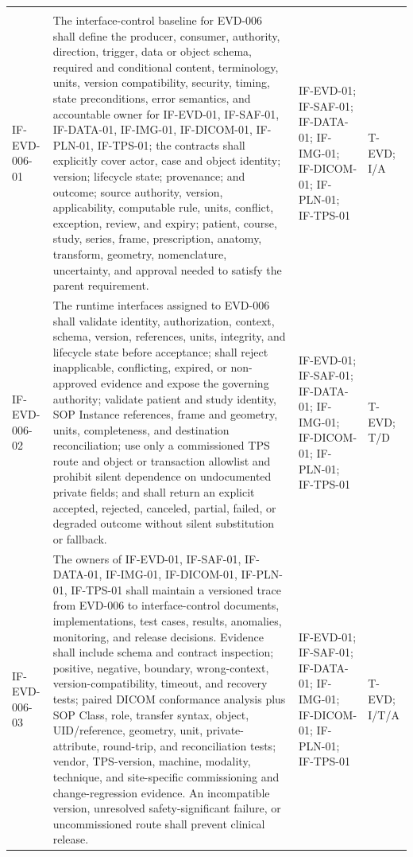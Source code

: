 \documentclass[11pt,letterpaper]{article}
\begin{document}
\begin{scriptsize}
\begin{longtable}{@{}L{0.14\textwidth}L{0.49\textwidth}L{0.19\textwidth}L{0.10\textwidth}@{}}
\addlinespace[2pt]
 \\
\addlinespace[2pt]
\mbox{IF-EVD-006-01} & The interface-control baseline for EVD-006 shall define the producer, consumer, authority, direction, trigger, data or object schema, required and conditional content, terminology, units, version compatibility, security, timing, state preconditions, error semantics, and accountable owner for IF-EVD-01, IF-SAF-01, IF-DATA-01, IF-IMG-01, IF-DICOM-01, IF-PLN-01, IF-TPS-01; the contracts shall explicitly cover actor, case and object identity; version; lifecycle state; provenance; and outcome; source authority, version, applicability, computable rule, units, conflict, exception, review, and expiry; patient, course, study, series, frame, prescription, anatomy, transform, geometry, nomenclature, uncertainty, and approval needed to satisfy the parent requirement. & IF-EVD-01; IF-SAF-01; IF-DATA-01; IF-IMG-01; IF-DICOM-01; IF-PLN-01; IF-TPS-01 & T-EVD; I\slash\allowbreak{}A \\
\addlinespace[2pt]
\mbox{IF-EVD-006-02} & The runtime interfaces assigned to EVD-006 shall validate identity, authorization, context, schema, version, references, units, integrity, and lifecycle state before acceptance; shall reject inapplicable, conflicting, expired, or non-approved evidence and expose the governing authority; validate patient and study identity, SOP Instance references, frame and geometry, units, completeness, and destination reconciliation; use only a commissioned TPS route and object or transaction allowlist and prohibit silent dependence on undocumented private fields; and shall return an explicit accepted, rejected, canceled, partial, failed, or degraded outcome without silent substitution or fallback. & IF-EVD-01; IF-SAF-01; IF-DATA-01; IF-IMG-01; IF-DICOM-01; IF-PLN-01; IF-TPS-01 & T-EVD; T\slash\allowbreak{}D \\
\addlinespace[2pt]
\mbox{IF-EVD-006-03} & The owners of IF-EVD-01, IF-SAF-01, IF-DATA-01, IF-IMG-01, IF-DICOM-01, IF-PLN-01, IF-TPS-01 shall maintain a versioned trace from EVD-006 to interface-control documents, implementations, test cases, results, anomalies, monitoring, and release decisions. Evidence shall include schema and contract inspection; positive, negative, boundary, wrong-context, version-compatibility, timeout, and recovery tests; paired DICOM conformance analysis plus SOP Class, role, transfer syntax, object, UID\slash\allowbreak{}reference, geometry, unit, private-attribute, round-trip, and reconciliation tests; vendor, TPS-version, machine, modality, technique, and site-specific commissioning and change-regression evidence. An incompatible version, unresolved safety-significant failure, or uncommissioned route shall prevent clinical release. & IF-EVD-01; IF-SAF-01; IF-DATA-01; IF-IMG-01; IF-DICOM-01; IF-PLN-01; IF-TPS-01 & T-EVD; I\slash\allowbreak{}T\slash\allowbreak{}A \\

\end{longtable}
\end{scriptsize}
\end{document}
